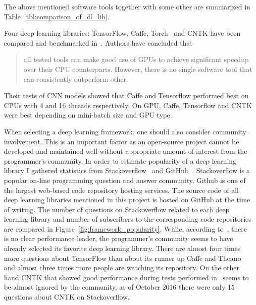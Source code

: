 \documentclass[a4paper, 11pt, table]{article}
\begin{document}
The above mentioned software tools together with some other are summarized in Table~\ref{tbl:comparison_of_dl_lib}. 

Four deep learning libraries: TensorFlow, Caffe, Torch~\cite{Collobert_NIPSWORKSHOP_2011} and CNTK have been compared and benchmarked in~\cite{DBLP:journals/corr/ShiWXC16}. Authors have concluded that \blockquote{all tested tools can make good use of GPUs to achieve significant speedup over their CPU counterparts. However, there is  no  single  software  tool  that  can  consistently  outperform other.} Their tests of CNN models showed that Caffe and Tensorflow performed best on CPUs with 4 and 16 threads respectively. On GPU, Caffe, Tensorflow and CNTK were best depending on mini-batch size and GPU type. 

When selecting a deep learning framework, one should also consider community involvement. This is an important factor as an open-source project cannot be developed and maintained well without appropriate amount of interest from the programmer's community. In order to estimate popularity of a deep learning library I gathered statistics from Stackoverflow~\cite{Mamykina:2011:DLF:1978942.1979366} and GitHub~\cite{Thung:2013:NSS:2495256.2495709}. Stackoverflow is a popular on-line programming question and answer community. Github is one of the largest web-based code repository hosting services. The source code of all deep learning libraries mentioned in this project is hosted on GitHub at the time of writing. The number of questions on Stackoverflow related to each deep learning library and number of subscribers to the corresponding code repositories are compared in Figure~\ref{fig:framework_popularity}. While, according to~\cite{DBLP:journals/corr/ShiWXC16}, there is no clear performance leader, the programmer's community seems to have already selected its favorite deep learning library. There are almost four times more questions about TensorFlow than about its runner up Caffe and Theano and almost three times more people are watching its repository. On the other hand CNTK that showed good performance during tests performed in~\cite{DBLP:journals/corr/ShiWXC16} seems to be almost ignored by the community, as of October 2016 there were only 15 questions about CNTK on Stackoverflow. 
\end{document}
